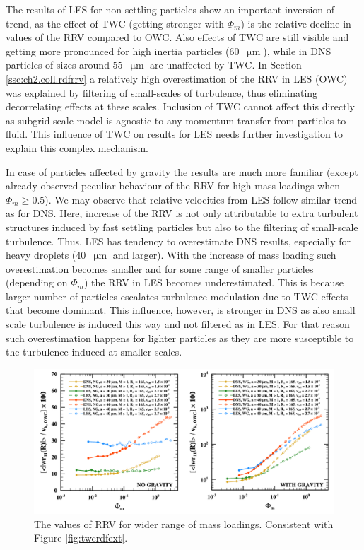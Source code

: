 \documentclass{pracamgren}
\begin{document}
The results of LES for non-settling particles show an important inversion of trend, as the effect of TWC (getting stronger with $\Phi_m$) is the relative decline in values of the RRV compared to OWC.
Also effects of TWC are still visible and getting more pronounced for high inertia particles ($60$~$\upmu\text{m}$), while in DNS particles of sizes around $55$~$\upmu\text{m}$ \parencite[Fig. 22a therein]{Rosa2020} are unaffected by TWC.
In Section \ref{ssc:ch2.coll.rdfrrv} a relatively high overestimation of the RRV in LES (OWC) was explained by filtering of small-scales of turbulence, thus eliminating decorrelating effects at these scales.
Inclusion of TWC cannot affect this directly as subgrid-scale model is agnostic to any momentum transfer from particles to fluid.
This influence of TWC on results for LES needs further investigation to explain this complex mechanism.

In case of particles affected by gravity the results are much more familiar (except already observed peculiar behaviour of the RRV for high mass loadings when $\Phi_m  \ge 0.5$).
We may observe that relative velocities from LES follow similar trend as for DNS.
Here, increase of the RRV is not only attributable to extra turbulent structures induced by fast settling particles but also to the filtering of small-scale turbulence.
Thus, LES has tendency to overestimate DNS results, especially for heavy droplets ($40$~$\upmu\text{m}$ and larger).
With the increase of mass loading such overestimation becomes smaller and for some range of smaller particles (depending on $\Phi_m$) the RRV in LES becomes underestimated.
This is because larger number of particles escalates turbulence modulation due to TWC effects that become dominant.
This influence, however, is stronger in DNS as also small scale turbulence is induced this way and not filtered as in LES.
For that reason such overestimation happens for lighter particles as they are more susceptible to the turbulence induced at smaller scales.

\begin{figure}[h]
\centering
\includegraphics[width=13.5cm]{figures/2-11_twcrrvext.pdf}
\caption{
The values of RRV for wider range of mass loadings.
Consistent with Figure \ref{fig:twcrdfext}.
}
\label{fig:twcrrvext}
\end{figure}
\end{document}
